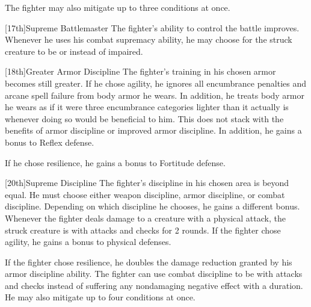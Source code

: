         \par The fighter may also mitigate up to three conditions at once.

        [17th]{Supreme Battlemaster}
        The fighter's ability to control the battle improves.
        Whenever he uses his combat supremacy ability, he may choose for the struck creature to be \taunted or \frightened instead of impaired.

        [18th]{Greater Armor Discipline}
        The fighter's training in his chosen armor becomes still greater.
        If he chose agility, he ignores all encumbrance penalties and arcane spell failure from body armor he wears.
        In addition, he treats body armor he wears as if it were three encumbrance categories lighter than it actually is whenever doing so would be beneficial to him.
        This does not stack with the benefits of armor discipline or improved armor discipline.
        In addition, he gains a  bonus to Reflex defense.

        If he chose resilience, he gains a  bonus to Fortitude defense.

        [20th]{Supreme Discipline}
        The fighter's discipline in his chosen area is beyond equal.
        He must choose either weapon discipline, armor discipline, or combat discipline.
        Depending on which discipline he chooses, he gains a different bonus.
        Whenever the fighter deals damage to a creature with a physical attack, the struck creature is \severelyimpaired with attacks and checks for 2 rounds.
        If the fighter chose agility, he gains a  bonus to physical defenses.

        If the fighter chose resilience, he doubles the damage reduction granted by his armor discipline ability.
        The fighter can use combat discipline to be \impaired with attacks and checks instead of suffering any nondamaging negative effect with a duration.
        He may also mitigate up to four conditions at once.

